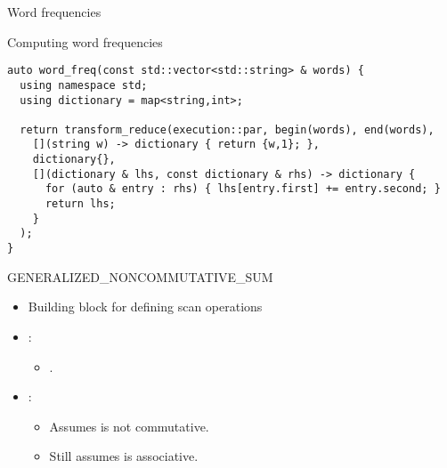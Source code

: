 \begin{frame}[t,fragile]{Word frequencies}
\begin{block}{Computing word frequencies}
\begin{lstlisting}
auto word_freq(const std::vector<std::string> & words) {
  using namespace std;
  using dictionary = map<string,int>;

  return transform_reduce(execution::par, begin(words), end(words),
    [](string w) -> dictionary { return {w,1}; },
    dictionary{},
    [](dictionary & lhs, const dictionary & rhs) -> dictionary {
      for (auto & entry : rhs) { lhs[entry.first] += entry.second; }
      return lhs;
    }
  );
}
\end{lstlisting}
\end{block}
\end{frame}


\begin{frame}[t]{GENERALIZED\_NONCOMMUTATIVE\_SUM}
\begin{itemize}
  \item Building block for defining scan operations
  \vfill
  \item {}:
    \begin{itemize}
      \item {}.
    \end{itemize}
  \vfill
  \item {}:
    \begin{itemize}
      \item Assumes  is not commutative.
      \item Still assumes  is associative.
    \end{itemize}
\end{itemize}
\end{frame}

